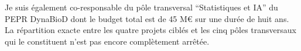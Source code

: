 Je suis également co-responsable du pôle transversal “Statistiques et IA” du PEPR DynaBioD dont le budget total est de 45 M\euro\xspace sur une durée de huit ans. La répartition exacte entre les quatre projets ciblés et les cinq pôles transversaux qui le constituent n'est pas encore complètement arrêtée.


